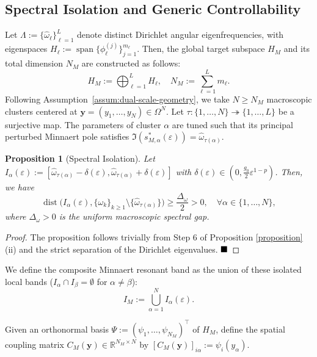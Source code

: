 \documentclass[11pt,a4paper]{article}
\numberwithin{equation}{section}
\newtheorem{proposition}[theorem]{Proposition}
\begin{document}
\subsection{Spectral Isolation and Generic Controllability}
\noindent
Let $\Lambda := \{\hat{\omega}_\ell\}_{\ell=1}^L$ denote distinct Dirichlet angular eigenfrequencies, with eigenspaces $H_\ell := \operatorname{span}\{\phi_\ell^{(j)}\}_{j=1}^{m_\ell}$. Then, the global target subspace $H_M$ and its total dimension $N_M$ are constructed as follows:
$$H_M := \bigoplus_{\ell=1}^L H_\ell, \quad N_M := \sum_{\ell=1}^L m_\ell.$$
Following Assumption~\ref{assum:dual-scale-geometry}, we take $N \ge N_M$ macroscopic clusters centered at $\mathbf{y} = (y_1, \dots, y_N) \in \Omega^N$. Let $\tau: \{1,\dots,N\} \twoheadrightarrow \{1,\dots,L\}$ be a surjective map. The parameters of cluster $\alpha$ are tuned such that its principal perturbed Minnaert pole satisfies $\Im(s^\ast_{M,\alpha}(\varepsilon)) = \hat{\omega}_{\tau(\alpha)}$. 



\begin{proposition}[Spectral Isolation]
\label{ass:target-Dirichlet}
Let $I_\alpha(\varepsilon) := [\hat{\omega}_{\tau(\alpha)} - \delta(\varepsilon), \hat{\omega}_{\tau(\alpha)} + \delta(\varepsilon)]$ with $\delta(\varepsilon) \in \left(0, \frac{g_0}{2} \varepsilon^{1-p}\right)$. Then, we have
\begin{equation}
    \operatorname{dist}\bigl(I_\alpha(\varepsilon), \{\omega_k\}_{k\ge1} \setminus \{\hat{\omega}_{\tau(\alpha)}\}\bigr) \ge \frac{\Delta_\omega}{2} > 0, \quad \forall \alpha \in \{1,\dots,N\},
\end{equation}
where $\Delta_\omega > 0$ is the uniform macroscopic spectral gap.
\end{proposition}

\begin{proof}
    The proposition follows trivially from Step 6 of Proposition \ref{proposition}(ii) and the strict separation of the Dirichlet eigenvalues. $\hfill \blacksquare$
\end{proof}

\noindent
We define the composite Minnaert resonant band as the union of these isolated local bands ($I_\alpha \cap I_\beta = \emptyset$ for $\alpha \neq \beta$):
\begin{equation}
    I_M := \bigcup_{\alpha=1}^N I_\alpha(\varepsilon).
\end{equation}

\noindent
Given an orthonormal basis $\Psi := (\psi_1, \dots, \psi_{N_M})^\top$ of $H_M$, define the spatial coupling matrix $C_M(\mathbf{y}) \in \mathbb{R}^{N_M \times N}$ by $[C_M(\mathbf{y})]_{i\alpha} := \psi_i(y_\alpha)$.
\end{document}
